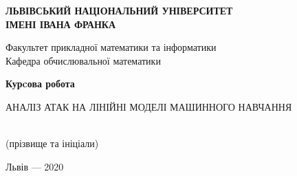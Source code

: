 \documentclass[a4paper,14pt]{extreport}
\begin{document}
	\begin{titlepage}%
    	\begin{center}
	    	{\textbf{ЛЬВІВСЬКИЙ НАЦІОНАЛЬНИЙ УНІВЕРСИТЕТ \\ ІМЕНІ ІВАНА ФРАНКА}}\par
	       	{Факультет прикладної математики та інформатики \\ Кафедра обчислювальної математики}\par
			\begin{center}
	
	        \end{center}
	        \vspace{25mm}
	        {\textbf{\huge{Курcова робота}}}\par
	        \vspace{5mm}
	        {АНАЛІЗ АТАК НА ЛІНІЙНІ МОДЕЛІ МАШИННОГО НАВЧАННЯ}\par
	        \vspace{5mm}
	        {}\par %
        \end{center}
	   	
	   	\vspace{30mm}
	   	
		\begin{flushright}
   	   		\begin{minipage}[t]{110mm}
   	   			 \\
	   	   		{\small{
			   	   		\hfill \footnotesize{(прізвище та ініціали)} \\
			   	   		\vspace{2ex}
				}}
   	   		\end{minipage}
   	   \end{flushright}
	   \vfill
   	   
   	   \begin{center}Львів --- 2020\end{center}
    \end{titlepage}
	\tableofcontents
\end{document}
